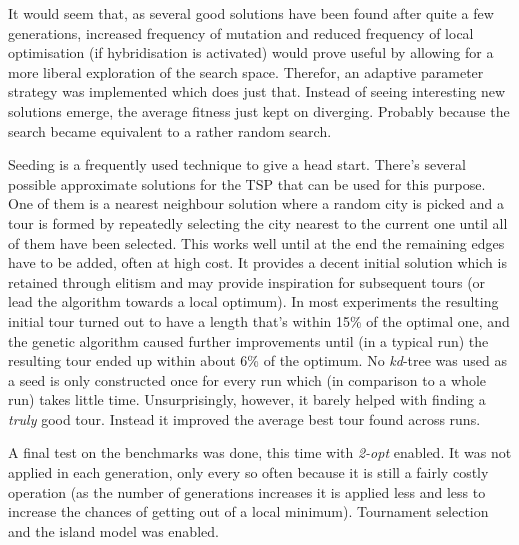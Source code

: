 

It would seem that, as several good solutions have been found after quite a few generations, increased frequency of mutation and reduced frequency of local optimisation (if hybridisation is activated) would prove useful by allowing for a more liberal exploration of the search space. Therefor, an adaptive parameter strategy was implemented which does just that. Instead of seeing interesting new solutions emerge, the average fitness just kept on diverging. Probably because the search became equivalent to a rather random search.


Seeding is a frequently used technique to give a head start. There's several possible approximate solutions for the TSP that can be used for this purpose. One of them is a nearest neighbour solution where a random city is picked and a tour is formed by repeatedly selecting the city nearest to the current one until all of them have been selected. This works well until at the end the remaining edges have to be added, often at high cost. It provides a decent initial solution which is retained through elitism and may provide inspiration for subsequent tours (or lead the algorithm towards a local optimum). In most experiments the resulting initial tour turned out to have a length that's within 15\% of the optimal one, and the genetic algorithm caused further improvements until (in a typical run) the resulting tour ended up within about 6\% of the optimum. No \textit{kd}-tree was used as a seed is only constructed once for every run which (in comparison to a whole run) takes little time. Unsurprisingly, however, it barely helped with finding a \textit{truly} good tour. Instead it improved the average best tour found across runs.


A final test on the benchmarks was done, this time with \textit{2-opt} enabled. It was not applied in each generation, only every so often because it is still a fairly costly operation (as the number of generations increases it is applied less and less to increase the chances of getting out of a local minimum). Tournament selection and the island model was enabled.

